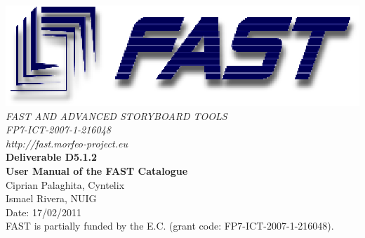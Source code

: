 \documentclass{fast_latex}
\newcommand\deliverableNumber{D5.1.2}
\newcommand\deliverableTitle{User Manual of the FAST Catalogue}
\newcommand\deliverableTitleShort{Catalogue User Manual}
\newcommand\authorOne{Ciprian Palaghita, Cyntelix}
\newcommand\authorTwo{Ismael Rivera, NUIG}
\begin{document}
	\begin{center}
		\includegraphics{images/FAST_logo}\\
		\vspace{1cm}
		{\LARGE{\sffamily \emph{FAST AND ADVANCED STORYBOARD TOOLS}}}\\
		\vspace{0.5cm}
		{\LARGE \sffamily \emph{FP7-ICT-2007-1-216048}}\\
		\vspace{0.5cm}
		{\LARGE \sffamily \emph{http://fast.morfeo-project.eu}}\\
		\vspace{4cm}
		{\LARGE \sffamily \textbf{Deliverable \deliverableNumber}}\\
		\vspace{0.5cm}
		{\LARGE \sffamily \textbf{\deliverableTitle}}\\
		\vspace{2cm}
		{\large \sffamily \authorOne}\\
		\vspace{0.2cm}
		{\large \sffamily \authorTwo}\\
		\vspace{0.5cm}
		\vfill
		{\large \sffamily Date: 17/02/2011}\\
		\vspace{1cm}
		{\sffamily FAST is partially funded by the E.C. (grant code: FP7-ICT-2007-1-216048).}
		
	\end{center}


\clearpage
\pagestyle{scrheadings}

\rohead{\small{\today}}
\end{document}
